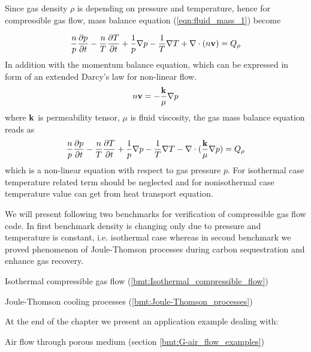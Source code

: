 Since gas density $\rho$ is depending on pressure and temperature, hence for compressible gas flow, mass balance equation  (\ref{eqn:fluid_mass_1}) become

\begin{equation}
\frac{n}{p} \frac{\partial p}{\partial t} -\frac{n}{T} \frac{\partial T}{\partial t}+\frac{1}{p}\nabla p -\frac{1}{T}\nabla T+\nabla \cdot (n \mathbf v)=Q_\rho
\end{equation}
In addition with the momentum balance equation, which can be expressed in form of an extended Darcy's law for non-linear flow.
\begin{equation}
n\v=-\frac{\k}{\mu}\nabla p
\label{eqn:darcy_gas}
\end{equation}
where $\mathbf k$ is permeability tensor, $\mu$ is fluid viscosity, the gas mass balance equation reads as
\begin{equation}
\frac{n}{p} \frac{\partial p}{\partial t} -\frac{n}{T} \frac{\partial T}{\partial t}+\frac{1}{p}\nabla p -\frac{1}{T}\nabla T-
\nabla \cdot (\frac{\mathbf k}{\mu}\nabla p)=Q_\rho
\end{equation}
which is a non-linear equation with respect to gas pressure $p$. For isothermal case temperature related term should be neglected and for nonisothermal case temperature value can get from heat transport equation.

We will present following two benchmarks for verification of compressible gas flow code. In first benchmark density is changing only due to pressure and temperature is constant, i.e. isothermal case whereas in second benchmark we proved phenomenon of Joule-Thomson processes during carbon sequestration and enhance gas recovery.

\begin{compactitem}
	\item Isothermal compressible gas flow (\ref{bmt:Isothermal_compressible_flow})
	\item Joule-Thomson cooling processes (\ref{bmt:Joule-Thomson_processes})
\end{compactitem}
At the end of the chapter we present an application example dealing with:

\begin{compactitem}
	\item Air flow through porous medium (section \ref{bmt:G-air_flow_examples})
\end{compactitem}
